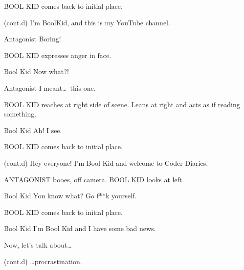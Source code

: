 \documentclass{screenplay}[2018/01/07]
\begin{document}
    BOOL KID comes back to initial place.

    \begin{dialogue}{(cont.d)}
        I'm BoolKid, and this is my YouTube channel.
    \end{dialogue}

    \begin{dialogue}{Antagonist}
        Boring!
    \end{dialogue}

    BOOL KID expresses anger in face.

    \begin{dialogue}{Bool Kid}
        Now what?!
    \end{dialogue}

    \begin{dialogue}{Antagonist}
        I meant\dots\ this one.
    \end{dialogue}

    BOOL KID reaches at right side of scene. Leans at right and acts as if
    reading something.

    \begin{dialogue}{Bool Kid}
        Ah! I see.
    \end{dialogue}


    BOOL KID comes back to initial place.

    \begin{dialogue}{(cont.d)}
        Hey everyone! I'm Bool Kid and welcome to Coder Diaries.
    \end{dialogue}

    ANTAGONIST booes, off camera.
    BOOL KID looks at left.

    \begin{dialogue}[shouting]{Bool Kid}
        You know what? Go f**k yourself.
    \end{dialogue}

    BOOL KID comes back to initial place.

    \begin{dialogue}{Bool Kid}
        I'm Bool Kid and I have some bad news.

        Now, let's talk about\dots
    \end{dialogue}



    \begin{dialogue}{(cont.d)}
        \dots procrastination.
    \end{dialogue}
    \fadeout

    \theend
\end{document}

